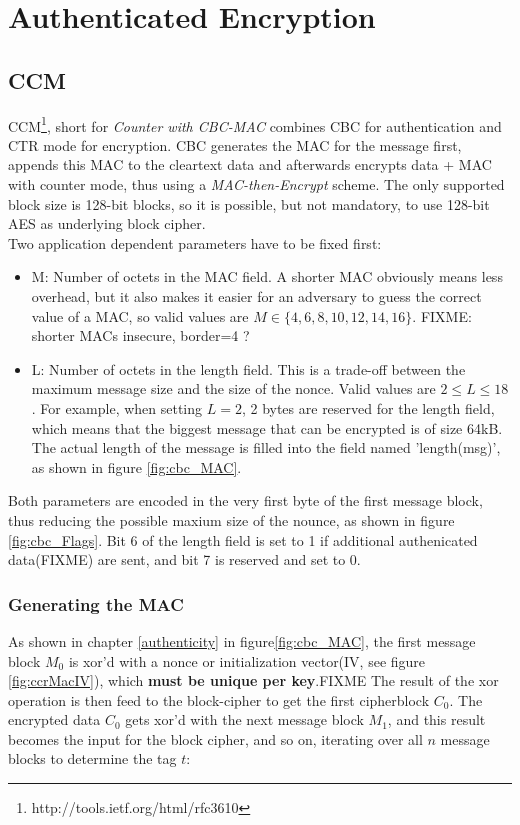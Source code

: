 \section{Authenticated Encryption}\label{authEncrypt}

\subsection{CCM}

CCM\footnote{http://tools.ietf.org/html/rfc3610}, short for \textit{Counter with CBC-MAC} combines CBC for authentication and CTR mode for encryption.
CBC generates the MAC for the message first, appends this MAC to the cleartext data and afterwards encrypts data + MAC with counter mode, thus using a
\textit{MAC-then-Encrypt} scheme. The only
supported block size is 128-bit blocks, so it is possible, but not mandatory, to use 128-bit AES as underlying block cipher.
\\
Two application dependent parameters have to be fixed first: 
\begin{itemize}
 \item M: Number of octets in the MAC field. A shorter MAC obviously means less overhead, but it also makes it easier for an adversary to guess the correct
 value of a MAC, so valid values are $M \in \{4, 6, 8, 10, 12, 14, 16\}$. FIXME: shorter MACs insecure, border=4 ? 
 \item L: Number of octets in the length field. This is a trade-off between the maximum message size and the size of the nonce. Valid values are $2 \leq L \leq 18$.
 For example, when setting $L = 2$, 2 bytes are reserved for the length field, which means that the biggest message that can be encrypted is of size 64kB. The actual
 length of the message is filled into the field named 'length(msg)', as shown in figure \ref{fig:cbc_MAC}.
\end{itemize}

Both parameters are encoded in the very first byte of the first message block, thus reducing the possible maxium size of the nounce, as shown in figure \ref{fig:cbc_Flags}.
Bit 6 of the length field is set to 1 if additional authenicated data(FIXME) are sent, and bit 7 is reserved and set to 0.


\subsubsection{Generating the MAC}

As shown in chapter \ref{authenticity} in figure\ref{fig:cbc_MAC}, the first message block $M_0$ is \gls{xor}'d with a nonce or initialization vector(IV, see figure
\ref{fig:ccrMacIV}), which \textbf{must be unique per key}.FIXME
The result of the \gls{xor} operation is then feed to the block-cipher to get the first cipherblock $C_0$. The encrypted data $C_0$ gets \gls{xor}'d with the next message block $M_1$, and this
result becomes the input for the block cipher, and so on, iterating over all $n$ message blocks to determine the tag $t$:

